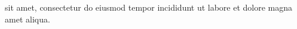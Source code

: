 \documentclass{scrbook}
\begin{document}
\beginnumbering
\autopar

  sit amet, consectetur  do eiusmod tempor  incididunt ut labore et dolore magna amet aliqua.

\endnumbering
\end{document}

